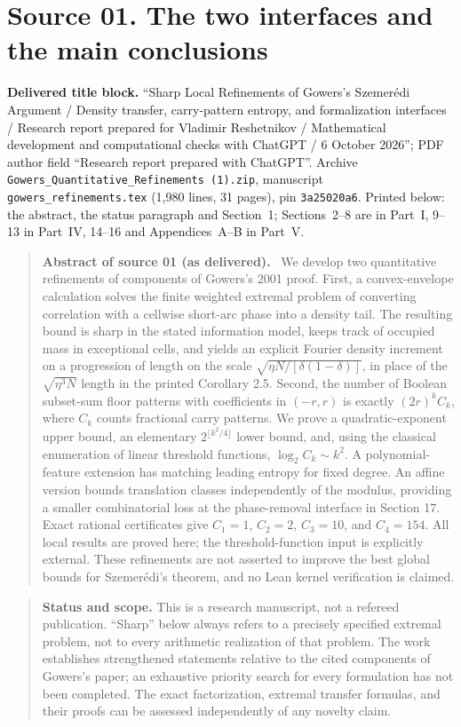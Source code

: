 \documentclass[11pt,letterpaper]{article}
\numberwithin{equation}{section}
\theoremstyle{definition}
\theoremstyle{remark}
\newcommand{\1}{\mathbf 1}
\newcommand{\file}[1]{\nolinkurl{#1}}
\newcommand{\srcnote}[2]{\par\noindent{\small\textit{Source #1, delivered #2.}}\par}
\newenvironment{partabstract}[1]{\begin{quote}\small\noindent\textbf{Abstract of source #1 (as delivered).}\ }{\end{quote}}
\newcommand{\partsource}[1]{\par\noindent\begin{minipage}{\textwidth}\small #1\end{minipage}\par\medskip}
\begin{document}
\section[{Source 01: The two interfaces and the main conclusions}]{Source 01. The two interfaces and the main conclusions}\label{gsr:fm:01:sec:d1}\label{gsr:fm:01:sec:overview}
\srcnote{01}{Section 1}
\partsource{\textbf{Delivered title block.} ``Sharp Local Refinements of Gowers's Szemer\'edi Argument / Density transfer, carry-pattern entropy, and formalization interfaces / Research report prepared for Vladimir Reshetnikov / Mathematical development and computational checks with ChatGPT / 6 October 2026''; PDF author field ``Research report prepared with ChatGPT''. Archive \file{Gowers\_Quantitative\_Refinements (1).zip}, manuscript \file{gowers\_refinements.tex} (1,980 lines, 31 pages), pin \texttt{3a25020a6}. Printed below: the abstract, the status paragraph and Section~1; Sections~2--8 are in Part~I, 9--13 in Part~IV, 14--16 and Appendices~A--B in Part~V.}
\begin{partabstract}{01}
We develop two quantitative refinements of components of Gowers's 2001 proof.
First, a convex-envelope calculation solves the finite weighted extremal problem
of converting correlation with a cellwise short-arc phase into a density tail.
The resulting bound is sharp in the stated information model, keeps track of
occupied mass in exceptional cells, and yields an explicit Fourier density
increment on a progression of length on the scale
$\sqrt{\eta N/[\delta(1-\delta)]}$, in place of the
$\sqrt{\eta^3N}$ length in the printed Corollary 2.5.
Second, the number of Boolean subset-sum floor patterns with coefficients in
$(-r,r)$ is exactly $(2r)^k C_k$, where $C_k$ counts fractional carry patterns.
We prove a quadratic-exponent upper bound, an elementary
$2^{\lfloor k^2/4\rfloor}$ lower bound, and, using the classical enumeration
of linear threshold functions, $\log_2 C_k\sim k^2$.
A polynomial-feature extension has matching leading entropy for fixed degree.
An affine version bounds translation classes independently of the modulus,
providing a smaller combinatorial loss at the phase-removal interface in
Section 17. Exact rational certificates give $C_1=1$, $C_2=2$, $C_3=10$,
and $C_4=154$.
All local results are proved here; the threshold-function input is explicitly
external. These refinements are not asserted to improve the best global
bounds for Szemer\'edi's theorem, and no Lean kernel verification is claimed.
\end{partabstract}
\begin{quote}\small
\noindent\textbf{Status and scope.}
This is a research manuscript, not a refereed publication. ``Sharp'' below
always refers to a precisely specified extremal problem, not to every
arithmetic realization of that problem. The work establishes strengthened
statements relative to the cited components of Gowers's paper; an exhaustive
priority search for every formulation has not been completed. The exact
factorization, extremal transfer formulas, and their proofs can be assessed
independently of any novelty claim.
\end{quote}
\end{document}
